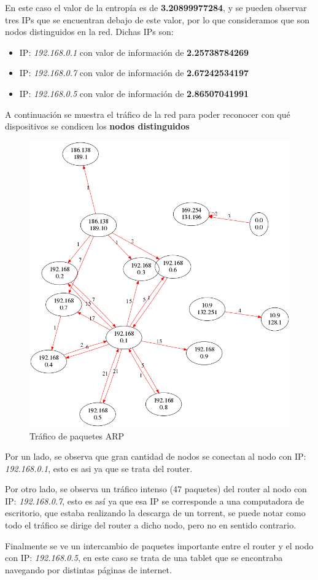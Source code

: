 En este caso el valor de la entropía es de \textbf{3.20899977284}, y se pueden observar tres IPs que se encuentran debajo de este valor, por lo que consideramos que son nodos distinguidos en la red. Dichas IPs son:
\begin{itemize}
\item IP: \textit{192.168.0.1} con valor de información de \textbf{2.25738784269}
\item IP: \textit{192.168.0.7} con valor de información de \textbf{2.67242534197}
\item IP: \textit{192.168.0.5} con valor de información de \textbf{2.86507041991}
\end{itemize}

A continuación se muestra el tráfico de la red para poder reconocer con qué dispositivos se condicen los \textbf{nodos distinguidos}

\begin{figure}[H]
       \centering
       \includegraphics[width=1\textwidth]{../resultados/Casa/network.png}
       \caption{Tráfico de paquetes ARP}
       \label{red-hogarena-arp-traffic}
\end{figure}

Por un lado, se observa que gran cantidad de nodos se conectan al nodo con IP: \textit{192.168.0.1}, esto es asi ya que se trata del router.

Por otro lado, se observa un tráfico intenso (47 paquetes) del router al nodo con IP: \textit{192.168.0.7}, esto es así ya que esa IP se corresponde a una computadora de escritorio, que estaba realizando la descarga de un torrent, se puede notar como todo el tráfico se dirige del router a dicho nodo, pero no en sentido contrario.

Finalmente se ve un intercambio de paquetes importante entre el router y el nodo con IP: \textit{192.168.0.5}, en este caso se trata de una tablet que se encontraba navegando por distintas páginas de internet.
